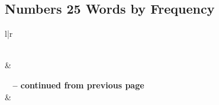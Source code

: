 

\subsection{Numbers 25 Words by Frequency}


\normalsize
 
\begin{center}
\begin{longtable}{l|r}
\caption[Numbers 25 Words by Frequency]{Numbers 25 Words by Frequency}\label{table:WordsbyFrequency for Numbers 25} \\
\hline {} &  \\ \hline 
\endfirsthead
 
{{\bfseries \tablename\ \thetable{} -- continued from previous page}} \\  
\hline {} &  \\ \hline 
\endhead
 

\end{longtable}
\end{center}
